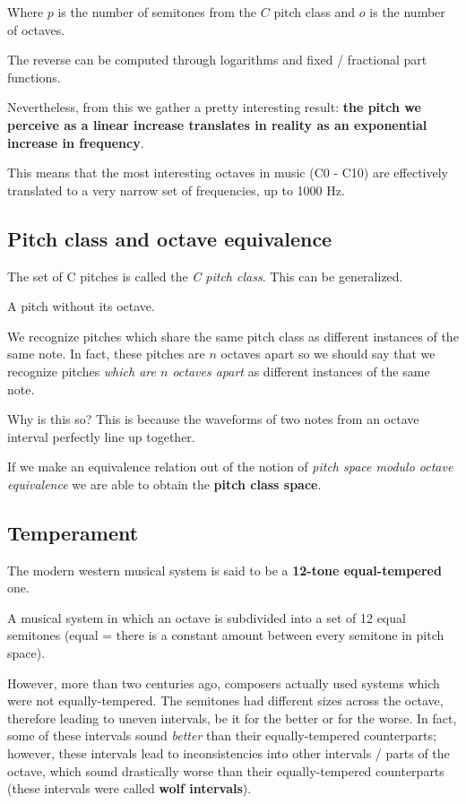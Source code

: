 Where $p$ is the number of semitones from the $C$ pitch class and $o$ is the number of octaves.

The reverse can be computed through logarithms and fixed / fractional part functions.

Nevertheless, from this we gather a pretty interesting result: \textbf{the pitch we perceive as a linear increase translates in reality as an exponential increase in frequency}.

This means that the most interesting octaves in music (C0 - C10) are effectively translated to a very narrow set of frequencies, up to 1000 Hz.

\subsection{Pitch class and octave equivalence}
The set of C pitches is called the \emph{C pitch class}. This can be generalized.

\begin{definition}
    A pitch without its octave.
\end{definition}

We recognize pitches which share the same pitch class as different instances of the same note. In fact, these pitches are $n$ octaves apart so we should say that we recognize pitches \emph{which are $n$ octaves apart} as different instances of the same note.

Why is this so? This is because the waveforms of two notes from an octave interval perfectly line up together.

If we make an equivalence relation out of the notion of \emph{pitch space modulo octave equivalence} we are able to obtain the \textbf{pitch class space}.

\subsection{Temperament}
The modern western musical system is said to be a \textbf{12-tone equal-tempered} one.

\begin{definition}
    A musical system in which an octave is subdivided into a set of 12 equal semitones (equal = there is a constant amount between every semitone in pitch space).
\end{definition}

However, more than two centuries ago, composers actually used systems which were not equally-tempered. The semitones had different sizes across the octave, therefore leading to uneven intervals, be it for the better or for the worse. In fact, some of these intervals sound \emph{better} than their equally-tempered counterparts; however, these intervals lead to inconsistencies into other intervals / parts of the octave, which sound drastically worse than their equally-tempered counterparts (these intervals were called \textbf{wolf intervals}).